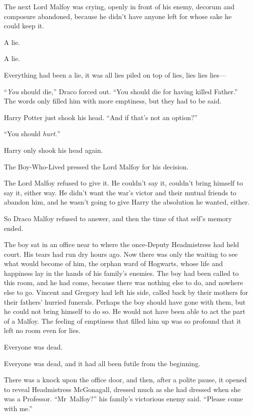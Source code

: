 The next Lord Malfoy was crying, openly in front of his enemy, decorum and composure abandoned, because he didn’t have anyone left for whose sake he could keep it.

A lie.

A lie.

Everything had been a lie, it was all lies piled on top of lies, lies lies lies—

“\emph{You} should die,” Draco forced out. “You should die for having killed Father.” The words only filled him with more emptiness, but they had to be said.

Harry Potter just shook his head. “And if that’s not an option?”

“You should \emph{hurt.}”

Harry only shook his head again.

The Boy-Who-Lived pressed the Lord Malfoy for his decision.

The Lord Malfoy refused to give it. He couldn’t say it, couldn’t bring himself to say it, either way. He didn’t want the war’s victor and their mutual friends to abandon him, and he wasn’t going to give Harry the absolution he wanted, either.

So Draco Malfoy refused to answer, and then the time of that self’s memory ended.

\later

The boy sat in an office near to where the once-Deputy Headmistress had held court. His tears had run dry hours ago. Now there was only the waiting to see what would become of him, the orphan ward of Hogwarts, whose life and happiness lay in the hands of his family’s enemies. The boy had been called to this room, and he had come, because there was nothing else to do, and nowhere else to go. Vincent and Gregory had left his side, called back by their mothers for their fathers’ hurried funerals. Perhaps the boy should have gone with them, but he could not bring himself to do so. He would not have been able to act the part of a Malfoy. The feeling of emptiness that filled him up was so profound that it left no room even for lies.

Everyone was dead.

Everyone was dead, and it had all been futile from the beginning.

There was a knock upon the office door, and then, after a polite pause, it opened to reveal Headmistress McGonagall, dressed much as she had dressed when she was a Professor. “Mr~Malfoy?” his family’s victorious enemy said. “Please come with me.”

